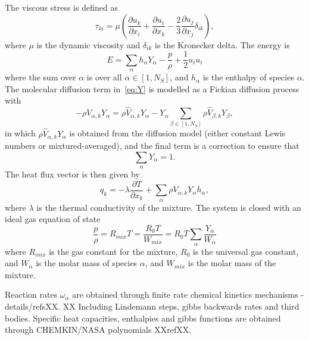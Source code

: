 \documentclass[notitlepage]{revtex4-1}
\begin{document}
The viscous stress is defined as 
\begin{equation}\tau_{ki}=\mu\left(\frac{\partial{u}_{k}}{\partial{x}_{i}}+\frac{\partial{u}_{i}}{\partial{x}_{k}}-\frac{2}{3}\frac{\partial{u}_{j}}{\partial{x}_{j}}\delta_{ik}\right)\label{eq:tau},\end{equation}
where $\mu$ is the dynamic viscosity and $\delta_{ik}$ is the Kronecker delta. The energy is
\begin{equation}E=\displaystyle\sum_{\alpha}h_{\alpha}Y_{\alpha}-\frac{p}{\rho}+\frac{1}{2}{u}_{i}{u}_{i}\label{eq:E}\end{equation}
where the sum over $\alpha$ is over all $\alpha\in\left[1,N_{S}\right]$, and $h_{\alpha}$ is the enthalpy of species $\alpha$. The molecular diffusion term in~\eqref{eq:Y} is modelled as a Fickian diffusion process with
\begin{equation}-\rho{V}_{\alpha,k}Y_{\alpha}=\rho\hat{V}_{\alpha,k}Y_{\alpha}-Y_{\alpha}\displaystyle\sum_{\beta\in\left[1,N_{S}\right]}\rho\hat{V}_{\beta,k}Y_{\beta}\label{eq:fickdiff},\end{equation}
in which $\rho\hat{V}_{\alpha,k}Y_{\alpha}$ is obtained from the diffusion model (either constant Lewis numbers or mixtured-averaged), and the final term is a correction to ensure that 
\begin{equation}\displaystyle\sum_{\alpha}Y_{\alpha}=1.\label{eq:sumY}\end{equation}
The heat flux vector is then given by
\begin{equation}q_{k}=-\lambda\frac{\partial{T}}{\partial{x}_{k}}+\displaystyle\sum_{\alpha}\rho{V}_{\alpha,k}Y_{\alpha}h_{\alpha}\label{eq:hfv},\end{equation}
where $\lambda$ is the thermal conductivity of the mixture.
The system is closed with an ideal gas equation of state
\begin{equation}\frac{p}{\rho}={R}_{mix}T=\frac{R_{0}T}{W_{mix}}={R}_{0}T\displaystyle\sum_{\alpha}\frac{Y_{\alpha}}{W_{\alpha}}\label{eq:eos}\end{equation}
where $R_{mix}$ is the gas constant for the mixture, $R_{0}$ is the universal gas constant, and $W_{\alpha}$ is the molar mass of species $\alpha$, and $W_{mix}$ is the molar mass of the mixture.

Reaction rates $\dot\omega_{\alpha}$ are obtained through finite rate chemical kinetics mechanisms - details/refsXX. XX Including Lindemann steps, gibbs backwards rates and third bodies.
Specific heat capacities, enthalpies and gibbs functions are obtained through CHEMKIN/NASA polynomials XXrefXX.
\end{document}

